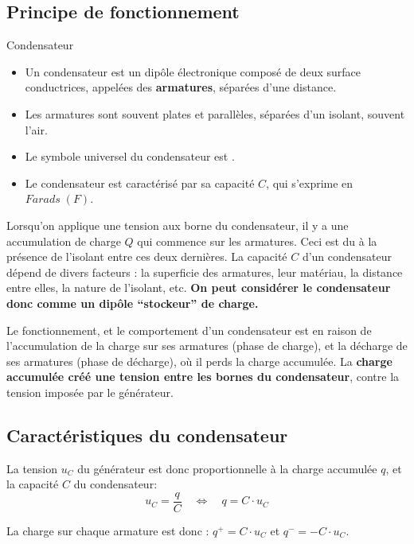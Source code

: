\documentclass[11pt,a4paper]{article}
\begin{document}
\subsection{Principe de fonctionnement}

\begin{defn}{Condensateur}
\begin{itemize}
    \item Un condensateur est un dipôle électronique composé de deux surface conductrices, appelées des \textbf{armatures}, séparées d'une distance. 
    \item Les armatures sont souvent plates et parallèles, séparées d'un isolant, souvent l'air. 
    \item Le symbole universel du condensateur est . 
    \item Le condensateur est caractérisé par sa capacité $C$, qui s'exprime en $Farads\; (F)$. 
\end{itemize}
\end{defn}

Lorsqu'on applique une tension aux borne du condensateur, il y a une accumulation de charge $Q$ qui commence sur les armatures. Ceci est du à la présence de l'isolant entre ces deux dernières. La capacité $C$ d'un condensateur dépend de divers facteurs : la superficie des armatures, leur matériau, la distance entre elles, la nature de l'isolant, etc. \textbf{On peut considérer le condensateur donc comme un dipôle ``stockeur'' de charge. }

Le fonctionnement, et le comportement d'un condensateur est en raison de l'accumulation de la charge sur ses armatures (phase de charge), et la décharge de ses armatures (phase de décharge), où il perds la charge accumulée. La \textbf{charge accumulée créé une tension entre les bornes du condensateur}, contre la tension imposée par le générateur. 

\subsection{Caractéristiques du condensateur}

La tension $u_C$ du générateur est donc proportionnelle à la charge accumulée $q$, et la capacité $C$ du condensateur: 
\begin{equation}
    u_C = \dfrac{q}{C} \quad \Longleftrightarrow \quad q=C\cdot u_C
\end{equation} 
 
La charge sur chaque armature est donc : $q^+ = C\cdot u_C$ et $q^- = -C\cdot u_C$. 
\end{document}
